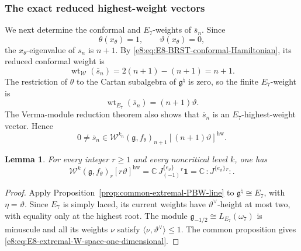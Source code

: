 \documentclass[11pt,reqno]{amsart}
\newtheorem{lemma}[theorem]{Lemma}
\theoremstyle{definition}
\theoremstyle{remark}
\providecommand{\C}{\mathbb{C}}
\providecommand{\Vac}{\mathbf{1}}
\providecommand{\g}{\mathfrak{g}}
\providecommand{\W}{\mathcal{W}}
\providecommand{\wt}{\operatorname{wt}}
\begin{document}
\subsubsection{The exact reduced highest-weight vectors}


We next determine the conformal and $E_7$-weights of $\overline{s}_n$.
Since
\begin{equation*}
  \theta(x_{\theta})=1,
  \qquad
  \vartheta(x_{\theta})=0,
\end{equation*}
the $x_{\theta}$-eigenvalue of $s_n$ is $n+1$.  By
\eqref{e8:eq:E8-BRST-conformal-Hamiltonian}, its reduced conformal weight is
\begin{equation*}
  \wt_{\W}(\overline{s}_n)
  =2(n+1)-(n+1)=n+1.
\end{equation*}
The restriction of $\theta$ to the Cartan subalgebra of $\g^{\natural}$ is
zero, so the finite $E_7$-weight is
\begin{equation*}
  \wt_{E_7}(\overline{s}_n)=(n+1)\vartheta.
\end{equation*}
The Verma-module reduction theorem also shows that $\overline{s}_n$ is an
$E_7$-highest-weight vector.  Hence
\begin{equation}
  0\neq\overline{s}_n
  \in
  \W^{k_n}(\g,f_{\theta})_{n+1}
  [(n+1)\vartheta]^{\mathrm{hw}}.
  \label{e8:eq:E8-reduced-sn-extremal-space}
\end{equation}

\begin{lemma}
\label{e8:lem:E8-extremal-W-weight-space}
For every integer $r\ge1$ and every noncritical level $k$, one has
\begin{equation}
  \W^k(\g,f_{\theta})_{r}
  [r\vartheta]^{\mathrm{hw}}
  =\C\,J^{\{e_{\vartheta}\}}_{(-1)}{}^{r}\Vac
  =\C\,:J^{\{e_{\vartheta}\}}{}^{r}:.
  \label{e8:eq:E8-extremal-W-space-one-dimensional}
\end{equation}
\end{lemma}

\begin{proof}
Apply Proposition~\ref{prop:common-extremal-PBW-line} to
\(\mathfrak g^\natural\cong E_7\), with \(\eta=\vartheta\).  Since
\(E_7\) is simply laced, its current weights have
\(\vartheta^\vee\)-height at most two, with equality only at the highest
root.  The module
\(\mathfrak g_{-1/2}\cong L_{E_7}(\omega_7)\) is minuscule and all its
weights \(\nu\) satisfy
\(\langle\nu,\vartheta^\vee\rangle\le1\).  The common proposition gives
\eqref{e8:eq:E8-extremal-W-space-one-dimensional}.
\end{proof}
\end{document}
